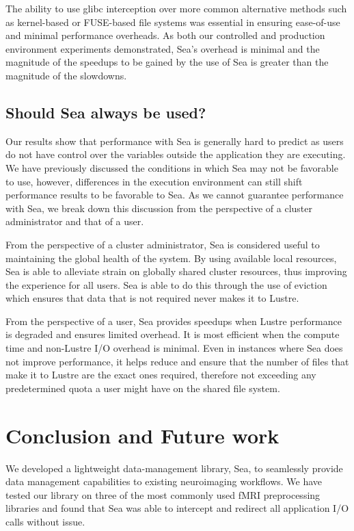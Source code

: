 \documentclass[pdflatex,sn-mathphys-num]{sn-jnl}
\theoremstyle{thmstyleone}%
\theoremstyle{thmstyletwo}%
\theoremstyle{thmstylethree}%
\begin{document}
    The ability to use glibc interception over more common alternative methods
    such as kernel-based or FUSE-based file systems was essential in ensuring
    ease-of-use and minimal performance overheads. As both our controlled and
    production environment experiments demonstrated, Sea's overhead is minimal
    and the magnitude of the speedups to be gained by the use of Sea is
    greater than the magnitude of the slowdowns.
    
    \subsection{Should Sea always be used?}
    
    Our results show that performance with Sea is generally hard to predict as
    users do not have control over the variables outside the application they
    are executing. We have previously discussed the conditions in which Sea may
    not be favorable to use, however, differences in the execution environment
    can still shift performance results to be favorable to Sea. As we cannot
    guarantee performance with Sea, we break down this discussion from the
    perspective of a cluster administrator and that of a user.

    From the perspective of a cluster administrator, Sea is considered useful to
    maintaining the global health of the system. By using available local
    resources, Sea is able to alleviate strain on globally shared cluster
    resources, thus improving the experience for all users. Sea is able to do
    this through the use of eviction which ensures that data that is not
    required never makes it to Lustre.


    From the perspective of a user, Sea provides speedups when
    Lustre performance is degraded and ensures limited overhead. It is most efficient
    when the compute time and non-Lustre I/O overhead is minimal. Even in
    instances where Sea does not improve performance, it helps reduce and ensure
    that the number of files that make it to Lustre are the exact ones required,
    therefore not exceeding any predetermined quota a user might have on the
    shared file system. 

    \section{Conclusion and Future work}

    We developed a lightweight data-management library, Sea, to seamlessly
    provide data management capabilities to existing neuroimaging workflows. We
    have tested our library on three of the most commonly used fMRI
    preprocessing libraries and found that Sea was able to intercept and
    redirect all application I/O calls without issue. 
\end{document}

